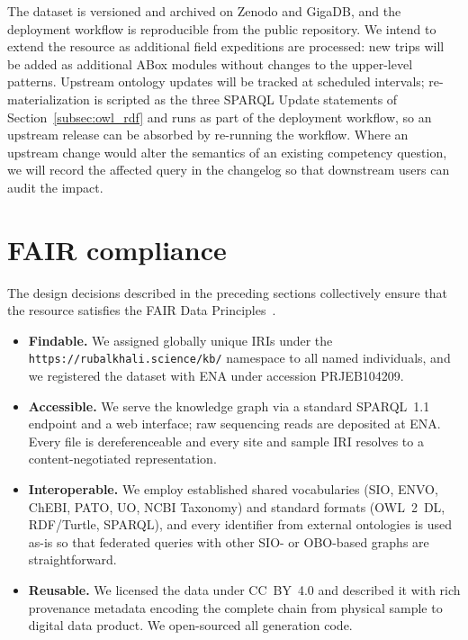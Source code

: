 \documentclass[11pt,a4paper]{article}
\begin{document}
The dataset is versioned and archived on Zenodo and GigaDB, and the
deployment workflow is reproducible from the public repository. We
intend to extend the resource as additional field expeditions are
processed: new trips will be added as additional ABox modules
without changes to the upper-level patterns. Upstream ontology
updates will be tracked at scheduled intervals; re-materialization
is scripted as the three SPARQL Update statements of
Section~\ref{subsec:owl_rdf} and runs as part of the deployment
workflow, so an upstream release can be absorbed by re-running the
workflow. Where an upstream change would alter the semantics of an
existing competency question, we will record the affected query in
the changelog so that downstream users can audit the impact.

\section{FAIR compliance}

The design decisions described in the preceding sections collectively
ensure that the resource satisfies the FAIR Data
Principles~\cite{fair}.
\begin{itemize}
  \item \textbf{Findable.} We assigned globally unique IRIs under
    the \texttt{https://rubalkhali.science/kb/} namespace to all
    named individuals, and we registered the dataset with ENA under
    accession PRJEB104209.
  \item \textbf{Accessible.} We serve the knowledge graph via a
    standard SPARQL~1.1 endpoint and a web interface; raw sequencing
    reads are deposited at ENA. Every file is dereferenceable and
    every site and sample IRI resolves to a content-negotiated
    representation.
  \item \textbf{Interoperable.} We employ established shared
    vocabularies (SIO, ENVO, ChEBI, PATO, UO, NCBI Taxonomy) and
    standard formats (OWL~2~DL, RDF/Turtle, SPARQL), and every
    identifier from external ontologies is used as-is so that
    federated queries with other SIO- or OBO-based graphs are
    straightforward.
  \item \textbf{Reusable.} We licensed the data under CC~BY~4.0 and
    described it with rich provenance metadata encoding the
    complete chain from physical sample to digital data product. We
    open-sourced all generation code.
\end{itemize}
\end{document}
